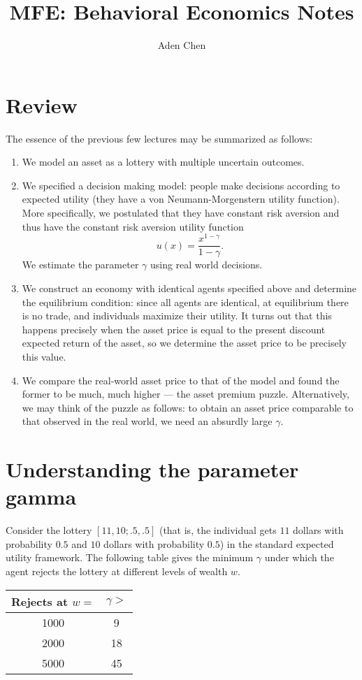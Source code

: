 \documentclass[oneside,reqno,letterpaper]{amsart}
\title[MFE: Behavioral Economics Notes]{MFE: Behavioral Economics Notes}
\author{Aden Chen}
\begin{document}
\maketitle
\tableofcontents

\section{Review}
The essence of the previous few lectures may be summarized as follows:
\begin{enumerate}[label=(\roman*)]
  \item We model an asset as a lottery with multiple uncertain outcomes.
  \item We specified a decision making model: people make decisions according to expected utility (they have a von Neumann-Morgenstern utility function). 
    More specifically, we postulated that they have constant risk aversion and thus have the constant risk aversion utility function
    \[
      u(x) = \frac{x^{1 - \gamma}}{1 - \gamma}.
    \] 
    We estimate the parameter \(\gamma\) using real world decisions.
  \item We construct an economy with identical agents specified above and determine the equilibrium condition: since all agents are identical, at equilibrium there is no trade, and individuals maximize their utility.
    It turns out that this happens precisely when the asset price is equal to the present discount expected return of the asset, so we determine the asset price to be precisely this value.
  \item We compare the real-world asset price to that of the model and found the former to be much, much higher --- the asset premium puzzle.
    Alternatively, we may think of the puzzle as follows:
    to obtain an asset price comparable to that observed in the real world, we need an absurdly large \(\gamma\).
\end{enumerate}


\section{Understanding the parameter gamma}
Consider the lottery \([11, 10; .5, .5]\) (that is, the individual gets \(11\) dollars with probability \(0.5\) and \(10\) dollars with probability \(0.5\)) in the standard expected utility framework.
The following table gives the minimum \(\gamma\) under which the agent rejects the lottery at different levels of wealth \(w\).

\begin{table}[H]
\centering
\begin{tabular}{ c c } 
  Rejects at \(w=\) & \(\gamma > \) \\ 
\hline
  \num{1000} & 9 \\ 
  \num{2000} & 18 \\ 
  \num{5000} & 45 \\ 
\end{tabular}
\end{table}
\end{document}

